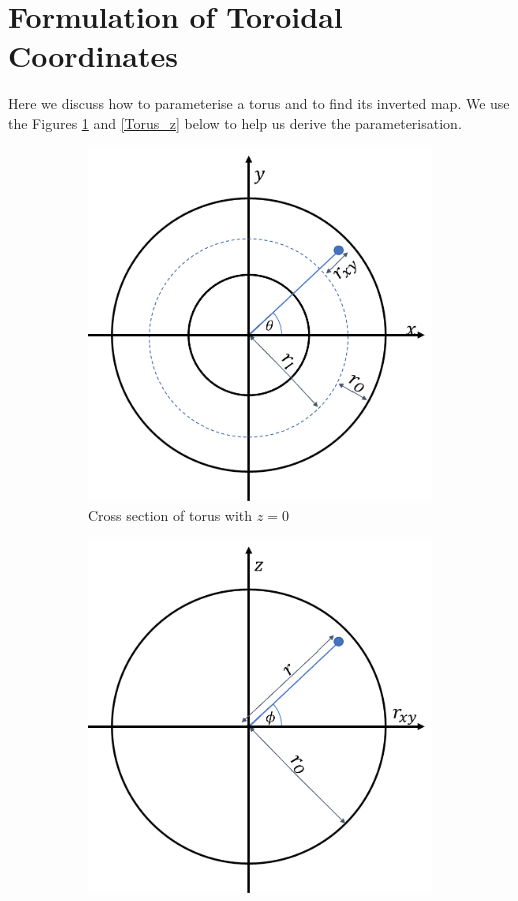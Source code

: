 \documentclass[12pt]{ociamthesis}
\begin{document}
\section{Formulation of Toroidal Coordinates}
Here we discuss how to parameterise a torus and to find its inverted map. We use the Figures \ref{Torus_XY} and \ref{Torus_z} below to help us derive the parameterisation.
\begin{figure}[H]
 \begin{subfigure}{0.5\textwidth}
     \includegraphics[width=\textwidth]{Pics/TorusCordsXY.png}
     \caption{Cross section of torus with $z=0$}
     \label{Torus_XY}
 \end{subfigure}
 \hfill
 \begin{subfigure}{0.5\textwidth}
     \includegraphics[width=\textwidth]{Pics/TorusCordsr_XYZ.png}

\end{subfigure}
\end{figure}
\end{document}
